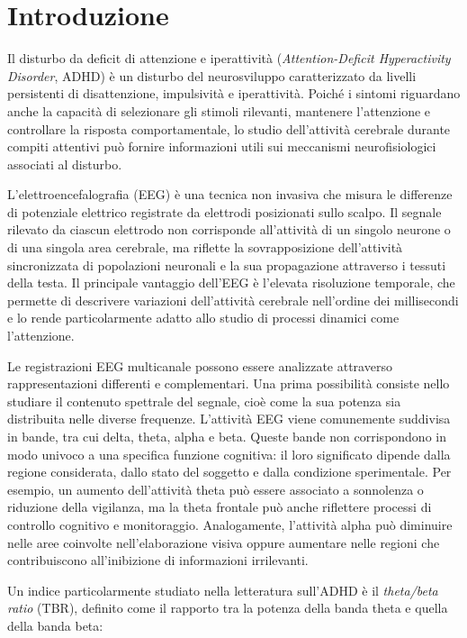 \section{Introduzione}

Il disturbo da deficit di attenzione e iperattività
(\textit{Attention-Deficit Hyperactivity Disorder}, ADHD) è un
disturbo del neurosviluppo caratterizzato da livelli persistenti di
disattenzione, impulsività e iperattività. Poiché i sintomi
riguardano anche la capacità di selezionare gli stimoli rilevanti,
mantenere l'attenzione e controllare la risposta comportamentale, lo
studio dell'attività cerebrale durante compiti attentivi può fornire
informazioni utili sui meccanismi neurofisiologici associati al
disturbo.

L'elettroencefalografia (EEG) è una tecnica non invasiva che misura
le differenze di potenziale elettrico registrate da elettrodi
posizionati sullo scalpo. Il segnale rilevato da ciascun elettrodo non
corrisponde all'attività di un singolo neurone o di una singola area
cerebrale, ma riflette la sovrapposizione dell'attività sincronizzata
di popolazioni neuronali e la sua propagazione attraverso i tessuti
della testa. Il principale vantaggio dell'EEG è l'elevata risoluzione
temporale, che permette di descrivere variazioni dell'attività
cerebrale nell'ordine dei millisecondi e lo rende particolarmente
adatto allo studio di processi dinamici come l'attenzione.

Le registrazioni EEG multicanale possono essere analizzate attraverso
rappresentazioni differenti e complementari. Una prima possibilità
consiste nello studiare il contenuto spettrale del segnale, cioè come
la sua potenza sia distribuita nelle diverse frequenze. L'attività EEG
viene comunemente suddivisa in bande, tra cui delta, theta, alpha e
beta. Queste bande non corrispondono in modo univoco a una specifica
funzione cognitiva: il loro significato dipende dalla regione
considerata, dallo stato del soggetto e dalla condizione sperimentale.
Per esempio, un aumento dell'attività theta può essere associato a
sonnolenza o riduzione della vigilanza, ma la theta frontale può anche
riflettere processi di controllo cognitivo e monitoraggio. Analogamente,
l'attività alpha può diminuire nelle aree coinvolte nell'elaborazione
visiva oppure aumentare nelle regioni che contribuiscono all'inibizione
di informazioni irrilevanti.

Un indice particolarmente studiato nella letteratura sull'ADHD è il
\textit{theta/beta ratio} (TBR), definito come il rapporto tra la
potenza della banda theta e quella della banda beta:

